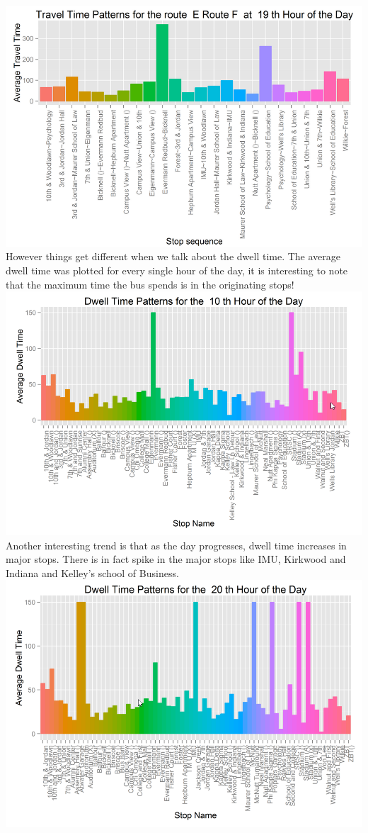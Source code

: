 \documentclass[12pt]{article}
\begin{document}
\includegraphics[scale=0.4]{resources/ggplot3}\\[1cm] 
However things get different when we talk about the dwell time. The average dwell time was plotted for every single hour of the day, it is interesting to note that the maximum time the bus spends is in the originating stops! \\
\includegraphics[scale=0.4]{resources/ggplot4}\\[1cm] 
Another interesting trend is that as the day progresses, dwell time increases in major stops. There is in fact spike in the major stops like IMU, Kirkwood and Indiana and Kelley's school of Business. \\
\includegraphics[scale=0.4]{resources/ggplot5}\\[1cm] 
\end{document}
